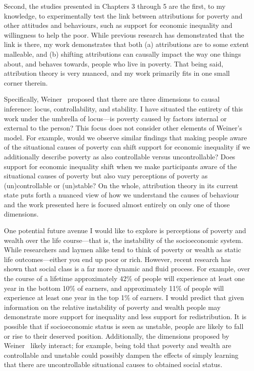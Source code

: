 \documentclass{sfuthesis}
\begin{document}
Second, the studies presented in Chapters 3 through 5 are the first, to my knowledge, to experimentally test the link between attributions for poverty and other attitudes and behaviours, such as support for economic inequality and willingness to help the poor. While previous research has demonstrated that the link is there, my work demonstrates that both (a) attributions are to some extent malleable, and (b) shifting attributions can causally impact the way one things about, and behaves towards, people who live in poverty. That being said, attribution theory is very nuanced, and my work primarily fits in one small corner therein.

Specifically, Weiner~\cite{weiner85} proposed that there are three dimensions to causal inference: locus, controllability, and stability. I have situated the entirety of this work under the umbrella of locus—is poverty caused by factors internal or external to the person? This focus does not consider other elements of Weiner’s~\cite{weiner85} model. For example, would we observe similar findings that making people aware of the situational causes of poverty can shift support for economic inequality if we additionally describe poverty as also controllable versus uncontrollable? Does support for economic inequality shift when we make participants aware of the situational causes of poverty but also vary perceptions of poverty as (un)controllable or (un)stable? On the whole, attribution theory in its current state puts forth a nuanced view of how we understand the causes of behaviour and the work presented here is focused almost entirely on only one of those dimensions.
	
One potential future avenue I would like to explore is perceptions of poverty and wealth over the life course—that is, the instability of the socioeconomic system. While researchers and laymen alike tend to think of poverty or wealth as static life outcomes—either you end up poor or rich. However, recent research has shown that social class is a far more dynamic and fluid process. For example, over the course of a lifetime approximately 42\% of people will experience at least one year in the bottom 10\% of earners\cite{rank15}, and approximately 11\% of people will experience at least one year in the top 1\% of earners\cite{hirschl15}. I would predict that given information on the relative instability of poverty and wealth people may demonstrate more support for inequality and less support for redistribution. It is possible that if socioeconomic status is seen as unstable, people are likely to fall or rise to their deserved position. Additionally, the dimensions proposed by Weiner~\cite{weiner85} likely interact; for example, being told that poverty and wealth are controllable and unstable could possibly dampen the effects of simply learning that there are uncontrollable situational causes to obtained social status.
\end{document}
